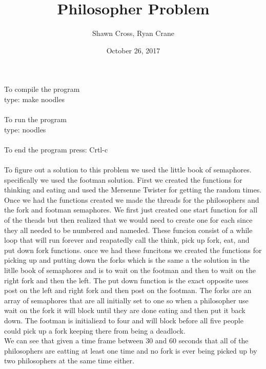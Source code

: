 \documentclass[letterpaper,10pt,titlepage]{article}
\begin{document}
\title{Philosopher Problem}
\date{October 26, 2017}
\author{Shawn Cross, Ryan Crane}
\maketitle

To compile the program\\type: make noodles\\\\To run the program\\type: noodles
\\\\To end the program press: Crtl-c\\\\

To figure out a solution to this problem we used the little book of semaphores. 
specifically we used the footman solution. First we created the functions for 
thinking and eating and used the Mersenne Twister for getting the random times. 
Once we had the functions created we made the threads for the philosophers and 
the fork and footman semaphores. We first just created one start function for 
all of the theads but then realized that we would need to create one for each 
since they all needed to be numbered and nameded. These funcion consist of a 
while loop that will run forever and reapatedly call the think, pick up fork, 
eat, and put down fork functions. once we had these funcitons we created the 
functions for picking up and putting down the forks which is the same a the 
solution in the litlle book of semaphores and is to wait on the footman and 
then to wait on the right fork and then the left. The put down function is 
the exact opposite uses post on the left and right fork and then post on the 
footman. The forks are an array of semaphores that are all initially set to 
one so when a philosopher use wait on the fork it will block until they are 
done eating and then put it back down. The footman is initialiezd to four and 
will block before all five people could pick up a fork keeping there from being 
a deadlock.\\ 

We can see that given a time frame between 30 and 60 seconds that all of the 
philosophers are eatting at least one time and no fork is ever being picked 
up by two philosophers at the same time either. 
\end{document}
